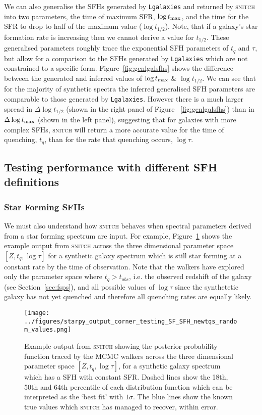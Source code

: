 \documentclass[useAMS,usenatbib]{mn2e}
\begin{document}
We can also generalise the SFHs generated by \texttt{Lgalaxies} and returned by \textsc{snitch} into two parameters, the time of maximum SFR, $\log t_{\rm{max}}$, and the time for the SFR to drop to half of the maximum value ($\log t_{1/2}$). Note, that if a galaxy's star formation rate is increasing then we cannot derive a value for $t_{1/2}$. These generalised parameters roughly trace the exponential SFH parameters of $t_q$ and $\tau$, but allow for a comparison to the SFHs generated by \texttt{Lgalaxies} which are not constrained to a specific form. Figure~\ref{fig:genlgalsfhs} shows the difference between the generated and inferred values of $\log t_{\rm{max}}$ \& $\log t_{1/2}$. We can see that for the majority of synthetic spectra the inferred generalised SFH parameters are comparable to those generated by \texttt{Lgalaxies}. However there is a much larger spread in $\Delta \log t_{1/2}$ (shown in the right panel of Figure ~\ref{fig:genlgalsfhs}) than in $\Delta \log t_{\rm{max}}$ (shown in the left panel), suggesting that for galaxies with more complex SFHs, \textsc{snitch} will return a more accurate value for the time of quenching, $t_q$, than for the rate that quenching occurs, $\log \tau$.



\subsection{Testing performance with different SFH definitions}\label{sec:diffSFHs}

\subsubsection{Star Forming SFHs}\label{secsec:starforming}

We must also understand how \textsc{snitch} behaves when spectral parameters derived from a star forming spectrum are input. For example, Figure~\ref{fig:sfgal} shows the example output from \textsc{snitch} across the three dimensional parameter space $[Z,t_q,\log \tau]$ for a synthetic galaxy spectrum which is still star forming at a constant rate by the time of observation. Note that the walkers have explored only the parameter space where $t_q > t_{obs}$, i.e. the observed redshift of the galaxy (see Section~\ref{sec:fsps}), and all possible values of $\log \tau$ since the synthetetic galaxy has not yet quenched and therefore all quenching rates are equally likely.  

\begin{figure}
\centering
\texttt{[image: ../figures/starpy\_output\_corner\_testing\_SF\_SFH\_newtqs\_random\_values.png]}
\caption{Example output from \textsc{snitch} showing the posterior probability function traced by the MCMC walkers across the three dimensional parameter space $[Z,t_q,\log \tau]$, for a synthetic galaxy spectrum which has a SFH with constant SFR.  Dashed lines show the 18th, 50th and 64th percentile of each distribution function which can be interpreted as the `best fit' with $1\sigma$. The blue lines show the known true values which \textsc{snitch} has managed to recover, within error. }
\label{fig:sfgal}
\end{figure}
\end{document}
